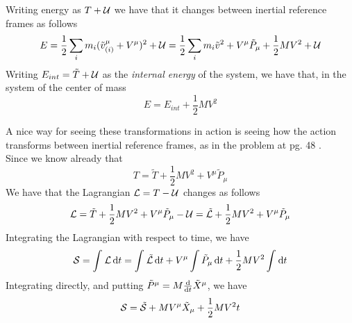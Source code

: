 \documentclass[../admech.tex]{subfiles}
\begin{document}
Writing energy as $T+\mathcal{U}$ we have that it changes between inertial reference frames as follows
\begin{equation}
	E=\frac{1}{2}\sum_im_i(\tilde{v}^\mu_{(i)}+V^\mu)^2+\mathcal{U}=\frac{1}{2}\sum_im_i\tilde{v}^2+V^\mu\tilde{P}_\mu+\frac{1}{2}MV^2+\mathcal{U}
	\label{eq:lagencm}
\end{equation}
Writing $E_{int}=\tilde{T}+\mathcal{U}$ as the \emph{internal energy} of the system, we have that, in the system of the center of mass
\begin{equation}
	E=E_{int}+\frac{1}{2}MV^2
	\label{eq:cmen}
\end{equation}
\begin{exe}
	A nice way for seeing these transformations in action is seeing how the action transforms between inertial reference frames, as in the problem at pg. 48 \cite{landau1}.\\
	Since we know already that
	\begin{equation}
		T=\tilde{T}+\frac{1}{2}MV^2+V^\mu\tilde{P}_\mu
		\label{eq:kinenintr}
	\end{equation}
	We have that the Lagrangian $\mathcal{L}=T-\mathcal{U}$ changes as follows
	\begin{equation}
		\mathcal{L}=\tilde{T}+\frac{1}{2}MV^2+V^\mu\tilde{P}_\mu-\mathcal{U}=\tilde{\mathcal{L}}+\frac{1}{2}MV^2+V^\mu\tilde{P}_\mu
		\label{eq:lagintr}
	\end{equation}
	Integrating the Lagrangian with respect to time, we have
	\begin{equation*}
		\mathcal{S}=\int_{}^{}\mathcal{L}\dd{t}=\int_{}^{}\tilde{\mathcal{L}}\dd{t}+V^\mu\int\tilde{P}_\mu\dd{t}+\frac{1}{2}MV^2\int_{}^{}\dd{t}
	\end{equation*}
	Integrating directly, and putting $\tilde{P}^\mu=M\dv{t}\tilde{X}^\mu$, we have
	\begin{equation}
		\mathcal{S}=\tilde{\mathcal{S}}+MV^\mu\tilde{X}_\mu+\frac{1}{2}MV^2t
		\label{eq:actintr}
	\end{equation}
\end{exe}
\end{document}
